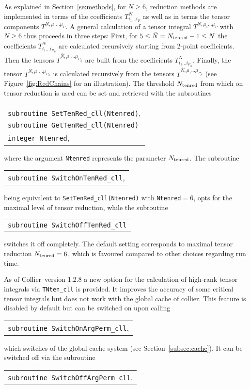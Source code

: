 \documentclass[preprint,sort&compress,12pt]{elsarticle}
\makeatletter
\def\bce{\begin{center}}
\def\ece{\end{center}}
\def\reffi#1{\mbox{Figure~\ref{#1}}}
\def\refse#1{\mbox{Section~\ref{#1}}}
\newcommand{\collier}{{\sc Collier}}
\newlength{\parwidth}\newlength{\colonewidth}%
\newcommand{\cpcsub}[1]
{%
\setlength{\parwidth}{\textwidth}\addtolength{\parwidth}{-2.1em}%
\bce
\begin{tabular}[t]{@{}p{\parwidth}@{}}
#1
\end{tabular}
\ece
}%
\makeatother
\begin{document}
As explained in \refse{se:methods}, for $N\ge 6$, reduction methods
are implemented in terms of the coefficients $T^{N}_{i_1\dots i_P}$ as
well as in terms the tensor components $T^{N,\mu_1\dots \mu_P}$. A
general calculation of a tensor integral $T^{N,\mu_1\dots \mu_P}$ with
$N\ge 6$ thus proceeds in three steps:
First, for $5\le \bar{N}=N_{\rm tenred}-1\le N$ the coefficients 
$T^{\bar{N}}_{i_1\dots i_{P_{\bar{N}}}}$ 
are calculated recursively
starting from 2-point coefficients. Then 
the tensors $T^{\bar{N},\mu_1\dots \mu_{P_{\bar{N}}}}$ are built from the coefficients 
$T^{\bar{N}}_{i_1\dots i_{P_{\bar{N}}}}$. Finally, the
tensor $T^{N,\mu_1\dots \mu_{P_{N}}}$ is calculated recursively from the tensors 
$T^{\bar{N},\mu_1\dots \mu_{P_{\bar{N}}}}$ (see \reffi{fig:RedChains}
for an illustration).
The threshold $N_{\rm tenred}$ from which on tensor reduction is used can be set and retrieved with the subroutines
\cpcsub{
{\tt subroutine  SetTenRed\_cll(Ntenred)}\;,\\
{\tt subroutine  GetTenRed\_cll(Ntenred)} \\
{\tt integer Ntenred}\;, \\
}
where the argument {\tt Ntenred} 
represents the parameter $N_{\rm tenred}$. The subroutine
\cpcsub{
{\tt subroutine  SwitchOnTenRed\_cll},
}
being equivalent to {\tt SetTenRed\_cll(Ntenred)} with {\tt Ntenred${=}6$},
opts for the maximal level of 
tensor reduction, while the subroutine
\cpcsub{
{\tt subroutine  SwitchOffTenRed\_cll}
}
switches it off completely. The default setting corresponds to maximal tensor reduction $N_{\rm tenred}=6$, 
which is favoured compared to other choices regarding run time.

As of \collier\ version 1.2.8 a new option for the calculation of
high-rank tensor integrals via {\tt TNten\_cll} is provided. It
improves the accuracy of some critical tensor integrals but does not
work with the global cache of collier. This feature is disabled by default
but can be switched on upon calling 
\cpcsub{
{\tt subroutine  SwitchOnArgPerm\_cll},
}
which switches of the global cache system (see \refse{subsec:cache}).
It can be switched off via the subroutine
\cpcsub{
{\tt subroutine  SwitchOffArgPerm\_cll}.
}
\end{document}
